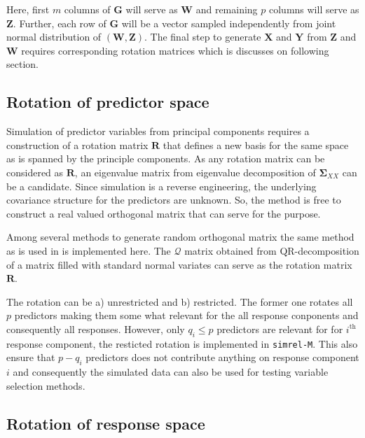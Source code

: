 \documentclass[12pt,A4paper,authoryear]{elsarticle} %
\begin{document}
Here, first \(m\) columns of \(\mathbf{G}\) will serve as \(\mathbf{W}\)
and remaining \(p\) columns will serve as \(\mathbf{Z}\). Further, each
row of \(\mathbf{G}\) will be a vector sampled independently from joint
normal distribution of \(\left(\mathbf{W}, \mathbf{Z}\right)\). The
final step to generate \(\mathbf{X}\) and \(\mathbf{Y}\) from
\(\mathbf{Z}\) and \(\mathbf{W}\) requires corresponding rotation
matrices which is discusses on following section.

\subsection{Rotation of predictor space}\label{rotation-predictor-space}

Simulation of predictor variables from principal components requires a
construction of a rotation matrix \(\mathbf{R}\) that defines a new
basis for the same space as is spanned by the principle components. As
any rotation matrix can be considered as \(\mathbf{R}\), an eigenvalue
matrix from eigenvalue decomposition of \(\boldsymbol{\Sigma}_{XX}\) can
be a candidate. Since simulation is a reverse engineering, the
underlying covariance structure for the predictors are unknown. So, the
method is free to construct a real valued orthogonal matrix that can
serve for the purpose.

Among several methods
\citep{anderson1987generation, heiberger1978algorithm} to generate
random orthogonal matrix the same method as is used in
\citet{saebo2015simrel} is implemented here. The \(\mathcal{Q}\) matrix
obtained from QR-decomposition of a matrix filled with standard normal
variates can serve as the rotation matrix \(\mathbf{R}\).

The rotation can be a) unrestricted and b) restricted. The former one
rotates all \(p\) predictors making them some what relevant for the all
response conponents and consequently all responses. However, only
\(q_i \le p\) predictors are relevant for for \(i^\text{th}\) response
component, the resticted rotation is implemented in \texttt{simrel-M}.
This also ensure that \(p-q_i\) predictors does not contribute anything
on response component \(i\) and consequently the simulated data can also
be used for testing variable selection methods.

\subsection{Rotation of response space}\label{rotation-response-space}
\end{document}
